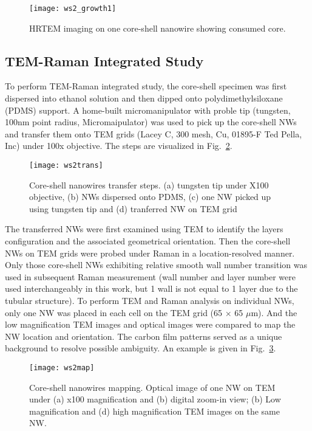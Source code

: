 \begin{figure}[htb]
\centering
\texttt{[image: ws2\_growth1]}
\caption[TEM imaging on core-shell NWs: 4]{HRTEM imaging on one core-shell nanowire showing consumed core.}
\label{fig:ch5ws2tem2}
\end{figure}


\subsection{TEM-Raman Integrated Study}\label{tms:raman} 

To perform TEM-Raman integrated study, the core-shell specimen was first dispersed into ethanol solution and then dipped onto polydimethylsiloxane (PDMS) support. A home-built micromanipulator with proble tip (tungsten, 100nm point radius, Micromaipulator) was used to pick up the core-shell NWs and transfer them onto TEM grids (Lacey C, 300 mesh, Cu, 01895-F Ted Pella, Inc) under 100x objective. The steps are visualized in Fig.~\ref{fig:ch5ws2trans}. 
\begin{figure}[htb]
\centering
\texttt{[image: ws2trans]}
\caption[Manipulating core-shell NWs]{Core-shell nanowires transfer steps. (a) tungsten tip under X100 objective, (b) NWs dispersed onto PDMS, (c) one NW picked up using tungsten tip and (d) tranferred NW on TEM grid}
\label{fig:ch5ws2trans}
\end{figure}

The transferred NWs were first examined using TEM to identify the  layers configuration and the associated geometrical orientation. Then the core-shell NWs on TEM grids were probed under Raman in a location-resolved manner. Only those core-shell NWs exhibiting relative smooth  wall number transition was used in subsequent Raman measurement (wall number and layer number were used interchangeably in this work, but 1 wall is not equal to 1 layer due to the tubular structure). To perform TEM and Raman analysis on individual NWs, only one NW was placed in each cell on the TEM grid (65 $\times$ 65 $\mu$m). And the low magnification TEM images and optical images were compared to map the NW location and orientation. The carbon film patterns served as a unique background to resolve possible ambiguity. An example is given in Fig.~\ref{fig:ch5ws2map}. 
\begin{figure}[htb]
\centering
\texttt{[image: ws2map]}
\caption[Mapping core-shell NWs]{Core-shell nanowires mapping.  Optical image of one NW on TEM under (a) x100 magnification and (b) digital zoom-in view; (b) Low magnification and (d) high magnification TEM images on the same NW.}
\label{fig:ch5ws2map}
\end{figure}

